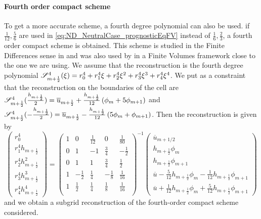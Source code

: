 \paragraph{Fourth order compact scheme}
To get a more accurate scheme,
a fourth degree polynomial can also be used.
if $\frac{1}{12}, \frac{5}{6}$ are used in
\eqref{eq:ND_NeutralCase_prognosticEqFV} instead of
$\frac{1}{6}, \frac{2}{3}$, a fourth order compact scheme
is obtained. This scheme is studied in the Finite Differences sense
in \citep{adam_highly_1977} and was also used
by \cite{piller_finite-volume_2004} in a Finite Volumes framework
close to the one we are using.
We assume that the reconstruction is the fourth degree
polynomial
${\cal S}_{m+\frac{1}{2}}^4(\xi) = r_0^4 + r_1^4 \xi + r_2^4 \xi^2 
+ r_3^4 \xi^3 + r_4^4 \xi^4$. We put as a constraint that the
reconstruction on the boundaries of the cell are
${\cal S}^4_{m+\frac{1}{2}}(\frac{h_{m+\frac{1}{2}}}{2}) =
\overline{u}_{m+\frac{1}{2}} + \frac{h_{m+\frac{1}{2}}}{12}\left(
\phi_m + 5\phi_{m+1}\right) $ and
${\cal S}^4_{m+\frac{1}{2}}(-\frac{h_{m+\frac{1}{2}}}{2}) =
\overline{u}_{m+\frac{1}{2}} - \frac{h_{m+\frac{1}{2}}}{12}\left(
5\phi_m + \phi_{m+1}\right)$.
Then the reconstruction is given by
\begin{equation}
    \begin{pmatrix}
    r_0^4 \\
    r_1^4 h_{m+\frac{1}{2}} \\
    r_2^4 h_{m+\frac{1}{2}}^2 \\
    r_3^4 h_{m+\frac{1}{2}}^3 \\
    r_4^4 h_{m+\frac{1}{2}}^4
    \end{pmatrix}
     = 
    \begin{pmatrix}
    1 & 0 & \frac{1}{12} & 0 & \frac{1}{80} \\
    0 & 1 & -1 & \frac{3}{4} & -\frac{1}{2} \\
    0 & 1 & 1 & \frac{3}{4} & \frac{1}{2} \\
    1 & -\frac{1}{2} & \frac{1}{4} & -\frac{1}{8}
    & \frac{1}{16} \\
    1 & \frac{1}{2} & \frac{1}{4} & \frac{1}{8}
    & \frac{1}{16} \\
    \end{pmatrix}^{-1}
    \begin{pmatrix}
    \overline{u}_{m+1/2} \\
    h_{m+\frac{1}{2}} \phi_m \\
	    h_{m+\frac{1}{2}} \phi_{m+1} \\
	    \overline{u} - \frac{5}{12} h_{m+\frac{1}{2}} \phi_m
	    - \frac{1}{12} h_{m+\frac{1}{2}} \phi_{m+1} \\
	    \overline{u} + \frac{1}{12} h_{m+\frac{1}{2}} \phi_m
	    + \frac{5}{12} h_{m+\frac{1}{2}} \phi_{m+1}
    \end{pmatrix}
\end{equation}
and we obtain a subgrid reconstruction of the fourth-order
compact scheme considered.

